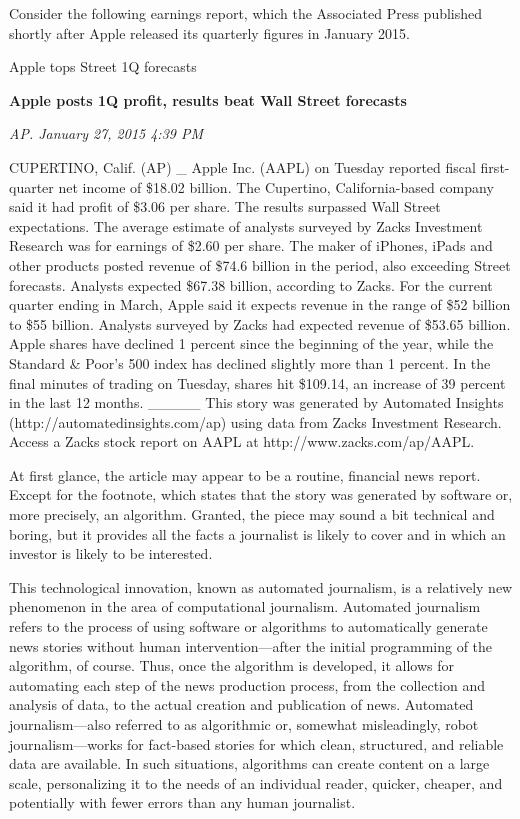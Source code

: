 \documentclass[notoc, symmetric, nobib, nols]{towcenter-guideto-book}
\begin{document}
Consider the following earnings report, which the Associated Press published shortly after Apple released its quarterly figures in January 2015.


Apple tops Street 1Q forecasts

\textbf{Apple posts 1Q profit, results beat Wall Street forecasts}

\textit{AP. January 27, 2015 4:39 PM}
\begin{framed}
CUPERTINO, Calif. (AP) \_ Apple Inc. (AAPL) on Tuesday reported fiscal first-quarter net income of \$18.02 billion. The Cupertino, California-based company said it had profit of \$3.06 per share. The results surpassed Wall Street expectations. The average estimate of analysts surveyed by Zacks Investment Research was for earnings of \$2.60 per share. The maker of iPhones, iPads and other products posted revenue of \$74.6 billion in the period, also exceeding Street forecasts. Analysts expected \$67.38 billion, according to Zacks. For the current quarter ending in March, Apple said it expects revenue in the range of \$52 billion to \$55 billion. Analysts surveyed by Zacks had expected revenue of \$53.65 billion. Apple shares have declined 1 percent since the beginning of the year, while the Standard & Poor's 500 index has declined slightly more than 1 percent. In the final minutes of trading on Tuesday, shares hit \$109.14, an increase of 39 percent in the last 12 months.
\_\_\_\_\_
This story was generated by Automated Insights (http://automatedinsights.com/ap) using data from Zacks Investment Research. Access a Zacks stock report on AAPL at http://www.zacks.com/ap/AAPL.
\end{framed}


At first glance, the article may appear to be a routine, financial news report. Except for the footnote, which states that the story was generated by software or, more precisely, an algorithm. Granted, the piece may sound a bit technical and boring, but it provides all the facts a journalist is likely to cover and in which an investor is likely to be interested. 

This technological innovation, known as automated journalism, is a relatively new phenomenon in the area of computational journalism. Automated journalism refers to the process of using software or algorithms to automatically generate news stories without human intervention---after the initial programming of the algorithm, of course. Thus, once the algorithm is developed, it allows for automating each step of the news production process, from the collection and analysis of data, to the actual creation and publication of news. Automated journalism---also referred to as algorithmic\autocite{doerr15} or, somewhat misleadingly, robot journalism\autocite{oremus15}---works for fact-based stories for which clean, structured, and reliable data are available. In such situations, algorithms can create content on a large scale, personalizing it to the needs of an individual reader, quicker, cheaper, and potentially with fewer errors than any human journalist. 
\end{document}
